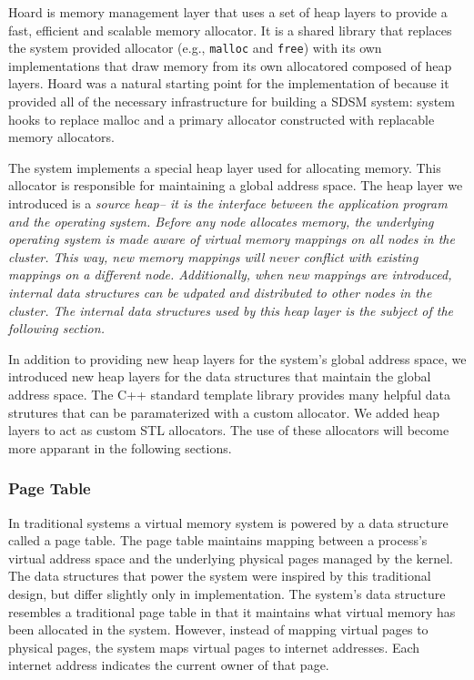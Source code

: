 Hoard is memory management layer that uses a set of heap layers to provide a fast, efficient and scalable memory allocator.  It is a shared library that replaces the system provided allocator (e.g., \verb,malloc, and \verb,free,) with its own implementations that draw memory from its own allocatored composed of heap layers.  Hoard was a natural starting point for the implementation of \projname{} because it provided all of the necessary infrastructure for building a SDSM system: system hooks to replace malloc and a primary allocator constructed with replacable memory allocators.

The \projname{} system implements a special heap layer used for allocating memory.  This allocator is responsible for maintaining a global address space.  The heap layer we introduced is a \em source heap\em -- it is the interface between the application program and the operating system.  Before any node allocates memory, the underlying operating system is made aware of virtual memory mappings on all nodes in the cluster.  This way, new memory mappings will never conflict with existing mappings on a different node.  Additionally, when new mappings are introduced, internal data structures can be udpated and distributed to other nodes in the cluster.  The internal data structures used by this heap layer is the subject of the following section.

In addition to providing new heap layers for the \projname{} system's global address space, we introduced new heap layers for the data structures that maintain the global address space.  The C++ standard template library provides many helpful data strutures that can be paramaterized with a custom allocator.  We added heap layers to act as custom STL allocators.  The use of these allocators will become more apparant in the following sections.

\subsubsection{Page Table}
In traditional systems a virtual memory system is powered by a data structure called a page table.  The page table maintains mapping between a process's virtual address space and the underlying physical pages managed by the kernel.  The data structures that power the \projname{} system were inspired by this traditional design, but differ slightly only in implementation.  The \projname{} system's data structure resembles a traditional page table in that it maintains what virtual memory has been allocated in the system.  However, instead of mapping virtual pages to physical pages, the system maps virtual pages to internet addresses.  Each internet address indicates the current owner of that page.

